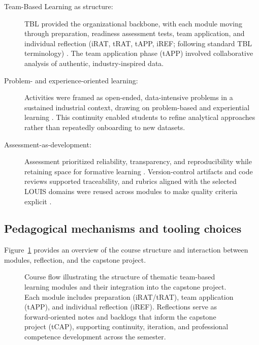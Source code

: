 \begin{description}
    \item[Team-Based Learning as structure:] 
  TBL provided the organizational backbone, with each module moving through preparation, readiness assessment tests, team application, and individual reflection (iRAT, tRAT, tAPP, iREF; following standard TBL terminology) \parencite{michaelsen2004team,fink2003creating,sibley2014getting}.  
  The team application phase (tAPP) involved collaborative analysis of authentic, industry-inspired data.

  \item[Problem- and experience-oriented learning:] 
  Activities were framed as open-ended, data-intensive problems in a sustained industrial context, drawing on problem-based and experiential learning \parencite{barrows1980problem,kolb1984experiential,Bruce2012}. This continuity enabled students to refine analytical approaches rather than repeatedly onboarding to new datasets.

  \item[Assessment-as-development:] 
  Assessment prioritized reliability, transparency, and reproducibility while retaining space for formative learning \parencite{hansen2023assessment}. Version-control artifacts and code reviews supported traceability, and rubrics aligned with the selected LOUIS domains were reused across modules to make quality criteria explicit \parencite{biggs_constructive,wiggins2005understanding}.
\end{description}

\subsection{Pedagogical mechanisms and tooling choices}

Figure~\ref{fig:course-flow} provides an overview of the course structure and interaction between modules, reflection, and the capstone project.

\begin{figure}[t]
  \centering
  
  \caption{Course flow illustrating the structure of thematic team-based learning modules and their integration into the capstone project. Each module includes preparation (iRAT/tRAT), team application (tAPP), and individual reflection (iREF). Reflections serve as forward-oriented notes and backlogs that inform the capstone project (tCAP), supporting continuity, iteration, and professional competence development across the semester.}
  \label{fig:course-flow}
\end{figure}

